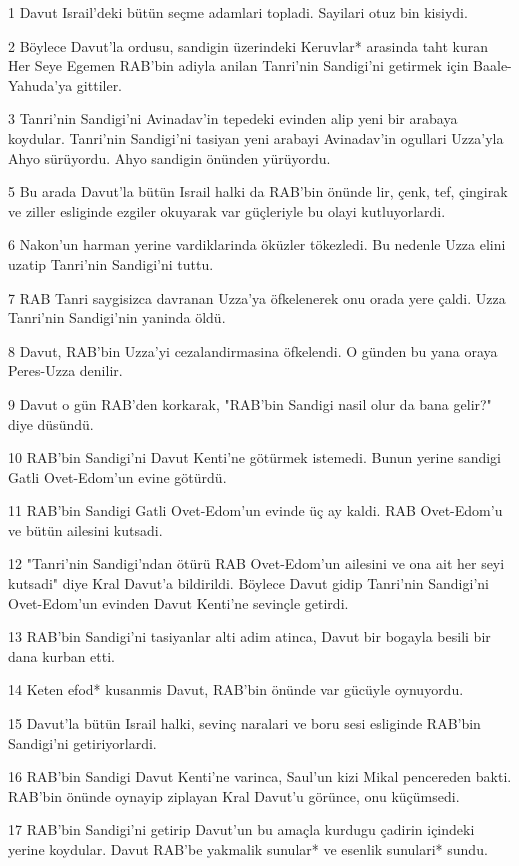 \par 1 Davut Israil'deki bütün seçme adamlari topladi. Sayilari otuz bin kisiydi.
\par 2 Böylece Davut'la ordusu, sandigin üzerindeki Keruvlar* arasinda taht kuran Her Seye Egemen RAB'bin adiyla anilan Tanri'nin Sandigi'ni getirmek için Baale-Yahuda'ya gittiler.
\par 3 Tanri'nin Sandigi'ni Avinadav'in tepedeki evinden alip yeni bir arabaya koydular. Tanri'nin Sandigi'ni tasiyan yeni arabayi Avinadav'in ogullari Uzza'yla Ahyo sürüyordu. Ahyo sandigin önünden yürüyordu.
\par 5 Bu arada Davut'la bütün Israil halki da RAB'bin önünde lir, çenk, tef, çingirak ve ziller esliginde ezgiler okuyarak var güçleriyle bu olayi kutluyorlardi.
\par 6 Nakon'un harman yerine vardiklarinda öküzler tökezledi. Bu nedenle Uzza elini uzatip Tanri'nin Sandigi'ni tuttu.
\par 7 RAB Tanri saygisizca davranan Uzza'ya öfkelenerek onu orada yere çaldi. Uzza Tanri'nin Sandigi'nin yaninda öldü.
\par 8 Davut, RAB'bin Uzza'yi cezalandirmasina öfkelendi. O günden bu yana oraya Peres-Uzza denilir.
\par 9 Davut o gün RAB'den korkarak, "RAB'bin Sandigi nasil olur da bana gelir?" diye düsündü.
\par 10 RAB'bin Sandigi'ni Davut Kenti'ne götürmek istemedi. Bunun yerine sandigi Gatli Ovet-Edom'un evine götürdü.
\par 11 RAB'bin Sandigi Gatli Ovet-Edom'un evinde üç ay kaldi. RAB Ovet-Edom'u ve bütün ailesini kutsadi.
\par 12 "Tanri'nin Sandigi'ndan ötürü RAB Ovet-Edom'un ailesini ve ona ait her seyi kutsadi" diye Kral Davut'a bildirildi. Böylece Davut gidip Tanri'nin Sandigi'ni Ovet-Edom'un evinden Davut Kenti'ne sevinçle getirdi.
\par 13 RAB'bin Sandigi'ni tasiyanlar alti adim atinca, Davut bir bogayla besili bir dana kurban etti.
\par 14 Keten efod* kusanmis Davut, RAB'bin önünde var gücüyle oynuyordu.
\par 15 Davut'la bütün Israil halki, sevinç naralari ve boru sesi esliginde RAB'bin Sandigi'ni getiriyorlardi.
\par 16 RAB'bin Sandigi Davut Kenti'ne varinca, Saul'un kizi Mikal pencereden bakti. RAB'bin önünde oynayip ziplayan Kral Davut'u görünce, onu küçümsedi.
\par 17 RAB'bin Sandigi'ni getirip Davut'un bu amaçla kurdugu çadirin içindeki yerine koydular. Davut RAB'be yakmalik sunular* ve esenlik sunulari* sundu.

